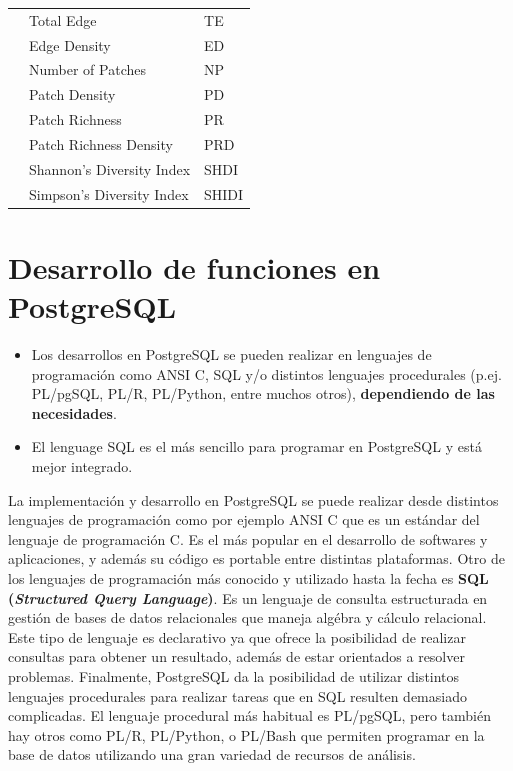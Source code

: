 \begin{table}[]
\begin{tabular}{lll}
                           & Total Edge                           & TE                   \\
                           & Edge Density                         & ED                   \\
                           & Number of Patches                    & NP                   \\
                           & Patch Density                        & PD                   \\
                           & Patch Richness                       & PR                   \\
                           & Patch Richness Density               & PRD                  \\
                           & Shannon's Diversity Index            & SHDI                 \\
                           & Simpson's Diversity Index            & SHIDI                \\ \hline
\end{tabular}
\end{table}


\section{Desarrollo de funciones en PostgreSQL}

\begin{graybox}
\begin{itemize}
\item Los desarrollos en PostgreSQL se pueden realizar en lenguajes de programación como ANSI C, SQL y/o distintos lenguajes procedurales (p.ej. PL/pgSQL, PL/R, PL/Python, entre muchos otros), \textbf{dependiendo de las necesidades}.
\item El lenguage SQL es el más sencillo para programar en PostgreSQL y está mejor integrado.
\end{itemize}
\end{graybox}

La implementación y desarrollo en PostgreSQL se puede realizar desde distintos lenguajes de programación como por ejemplo ANSI C que es un estándar del lenguaje de programación C. Es el más popular en el desarrollo de softwares y aplicaciones, y además su código es portable entre distintas plataformas. Otro de los lenguajes de programación más conocido y utilizado hasta la fecha es \textbf{SQL (\textit{Structured Query Language})}. Es un lenguaje de consulta estructurada en gestión de bases de datos relacionales que maneja algébra y cálculo relacional. Este tipo de lenguaje es declarativo ya que ofrece la posibilidad de realizar consultas para obtener un resultado, además de estar orientados a resolver problemas. Finalmente, PostgreSQL da la posibilidad de utilizar distintos lenguajes procedurales para realizar tareas que en SQL resulten demasiado complicadas. El lenguaje procedural más habitual es PL/pgSQL, pero también hay otros como PL/R, PL/Python, o PL/Bash que permiten programar en la base de datos utilizando una gran variedad de recursos de análisis.


